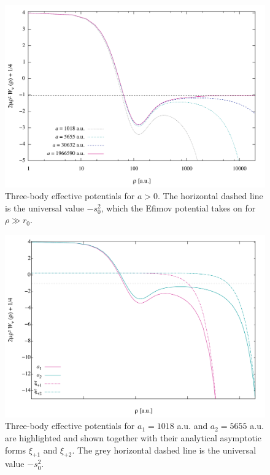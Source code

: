 \begin{figure}[htbp!]
	\includegraphics[width=\linewidth]{finite_positive_a.pdf}
	\caption{Three-body effective potentials for $a>0$. The horizontal dashed line is the universal value $-s_0^2$, which the Efimov potential takes on for $\rho\gg r_0$.}
	\label{fig:res_5}
\end{figure}

\begin{figure}[htbp!]
	\includegraphics[width=\linewidth]{finite_conv.pdf}
	\caption{Three-body effective potentials for $a_1=1018$ a.u. and $a_2=5655$ a.u. are highlighted and shown together with their analytical asymptotic forms $\xi_{+1}$ and $\xi_{+2}$. The grey horizontal dashed line is the universal value $-s_0^2$.}
	\label{fig:finite_conv}
\end{figure}

